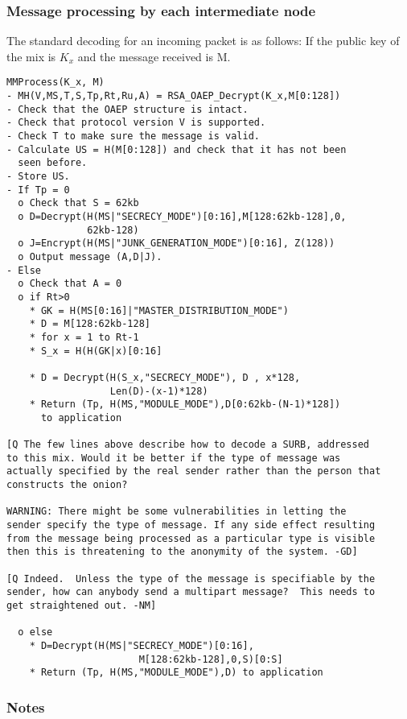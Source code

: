 \documentclass{article}
\begin{document}
\subsubsection{Message processing by each intermediate node}

The standard decoding for an incoming packet is as follows:
If the public key of the mix is $K_x$ and the message received is M.

\begin{verbatim}
MMProcess(K_x, M)
- MH(V,MS,T,S,Tp,Rt,Ru,A) = RSA_OAEP_Decrypt(K_x,M[0:128])
- Check that the OAEP structure is intact.
- Check that protocol version V is supported.
- Check T to make sure the message is valid.
- Calculate US = H(M[0:128]) and check that it has not been
  seen before.
- Store US.
- If Tp = 0
  o Check that S = 62kb
  o D=Decrypt(H(MS|"SECRECY_MODE")[0:16],M[128:62kb-128],0,
              62kb-128)
  o J=Encrypt(H(MS|"JUNK_GENERATION_MODE")[0:16], Z(128))
  o Output message (A,D|J).
- Else
  o Check that A = 0
  o if Rt>0 
    * GK = H(MS[0:16]|"MASTER_DISTRIBUTION_MODE")
    * D = M[128:62kb-128]
    * for x = 1 to Rt-1
    * S_x = H(H(GK|x)[0:16]

    * D = Decrypt(H(S_x,"SECRECY_MODE"), D , x*128, 
                  Len(D)-(x-1)*128)
    * Return (Tp, H(MS,"MODULE_MODE"),D[0:62kb-(N-1)*128]) 
      to application

[Q The few lines above describe how to decode a SURB, addressed
to this mix. Would it be better if the type of message was
actually specified by the real sender rather than the person that
constructs the onion?

WARNING: There might be some vulnerabilities in letting the
sender specify the type of message. If any side effect resulting
from the message being processed as a particular type is visible
then this is threatening to the anonymity of the system. -GD]

[Q Indeed.  Unless the type of the message is specifiable by the
sender, how can anybody send a multipart message?  This needs to
get straightened out. -NM] 

  o else
    * D=Decrypt(H(MS|"SECRECY_MODE")[0:16],
                       M[128:62kb-128],0,S)[0:S]
    * Return (Tp, H(MS,"MODULE_MODE"),D) to application
\end{verbatim}

\subsubsection{Notes}
\end{document}
